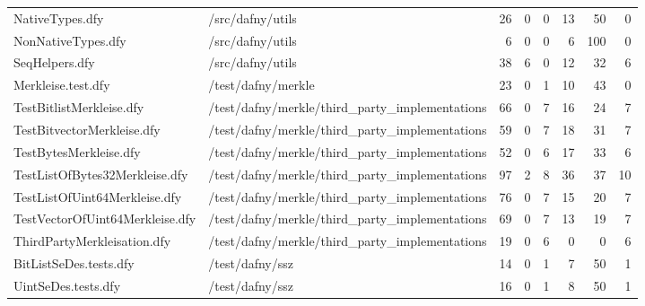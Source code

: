 \documentclass[a4paper, 12pt]{article}
\begin{document}
\begin{tabular}{llrrrrrr}
                 NativeTypes.dfy &                                /src/dafny/utils &    26 &         0 &                0 &             13 &             50 &       0 \\
              NonNativeTypes.dfy &                                /src/dafny/utils &     6 &         0 &                0 &              6 &            100 &       0 \\
                  SeqHelpers.dfy &                                /src/dafny/utils &    38 &         6 &                0 &             12 &             32 &       6 \\
              Merkleise.test.dfy &                              /test/dafny/merkle &    23 &         0 &                1 &             10 &             43 &       0 \\
        TestBitlistMerkleise.dfy &  /test/dafny/merkle/third\_party\_implementations &    66 &         0 &                7 &             16 &             24 &       7 \\
      TestBitvectorMerkleise.dfy &  /test/dafny/merkle/third\_party\_implementations &    59 &         0 &                7 &             18 &             31 &       7 \\
          TestBytesMerkleise.dfy &  /test/dafny/merkle/third\_party\_implementations &    52 &         0 &                6 &             17 &             33 &       6 \\
  TestListOfBytes32Merkleise.dfy &  /test/dafny/merkle/third\_party\_implementations &    97 &         2 &                8 &             36 &             37 &      10 \\
   TestListOfUint64Merkleise.dfy &  /test/dafny/merkle/third\_party\_implementations &    76 &         0 &                7 &             15 &             20 &       7 \\
 TestVectorOfUint64Merkleise.dfy &  /test/dafny/merkle/third\_party\_implementations &    69 &         0 &                7 &             13 &             19 &       7 \\
     ThirdPartyMerkleisation.dfy &  /test/dafny/merkle/third\_party\_implementations &    19 &         0 &                6 &              0 &              0 &       6 \\
          BitListSeDes.tests.dfy &                                 /test/dafny/ssz &    14 &         0 &                1 &              7 &             50 &       1 \\
             UintSeDes.tests.dfy &                                 /test/dafny/ssz &    16 &         0 &                1 &              8 &             50 &       1 \\

\end{tabular}
\end{document}
